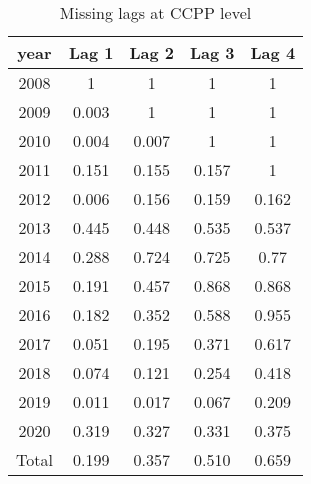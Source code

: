 \begin{table}[H]
\centering
\caption{Missing lags at CCPP level}
\begin{tabular}{ccccc}
\hline
year  & Lag 1 & Lag 2 & Lag 3 & Lag 4 \\ \hline
2008  & 1     & 1     & 1     & 1     \\
2009  & 0.003 & 1     & 1     & 1     \\
2010  & 0.004 & 0.007 & 1     & 1     \\
2011  & 0.151 & 0.155 & 0.157 & 1     \\
2012  & 0.006 & 0.156 & 0.159 & 0.162 \\
2013  & 0.445 & 0.448 & 0.535 & 0.537 \\
2014  & 0.288 & 0.724 & 0.725 & 0.77  \\
2015  & 0.191 & 0.457 & 0.868 & 0.868 \\
2016  & 0.182 & 0.352 & 0.588 & 0.955 \\
2017  & 0.051 & 0.195 & 0.371 & 0.617 \\
2018  & 0.074 & 0.121 & 0.254 & 0.418 \\
2019  & 0.011 & 0.017 & 0.067 & 0.209 \\
2020  & 0.319 & 0.327 & 0.331 & 0.375 \\ \hline
Total & 0.199 & 0.357 & 0.510 & 0.659 \\ \hline
\end{tabular}
\end{table}